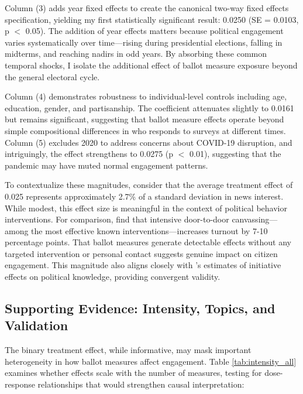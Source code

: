 \documentclass[12pt,letterpaper,oneside]{book}
\begin{document}
Column (3) adds year fixed effects to create the canonical two-way fixed effects specification, yielding my first statistically significant result: 0.0250 (SE = 0.0103, p $<$ 0.05). The addition of year effects matters because political engagement varies systematically over time---rising during presidential elections, falling in midterms, and reaching nadirs in odd years. By absorbing these common temporal shocks, I isolate the additional effect of ballot measure exposure beyond the general electoral cycle.

Column (4) demonstrates robustness to individual-level controls including age, education, gender, and partisanship. The coefficient attenuates slightly to 0.0161 but remains significant, suggesting that ballot measure effects operate beyond simple compositional differences in who responds to surveys at different times. Column (5) excludes 2020 to address concerns about COVID-19 disruption, and intriguingly, the effect strengthens to 0.0275 (p $<$ 0.01), suggesting that the pandemic may have muted normal engagement patterns.

To contextualize these magnitudes, consider that the average treatment effect of 0.025 represents approximately 2.7\% of a standard deviation in news interest. While modest, this effect size is meaningful in the context of political behavior interventions. For comparison, \citet{gerber2003voting} find that intensive door-to-door canvassing---among the most effective known interventions---increases turnout by 7-10 percentage points. That ballot measures generate detectable effects without any targeted intervention or personal contact suggests genuine impact on citizen engagement. This magnitude also aligns closely with \citet{smith2004educated}'s estimates of initiative effects on political knowledge, providing convergent validity.

\subsection{Supporting Evidence: Intensity, Topics, and Validation}

The binary treatment effect, while informative, may mask important heterogeneity in how ballot measures affect engagement. Table \ref{tab:intensity_all} examines whether effects scale with the number of measures, testing for dose-response relationships that would strengthen causal interpretation:
\end{document}
